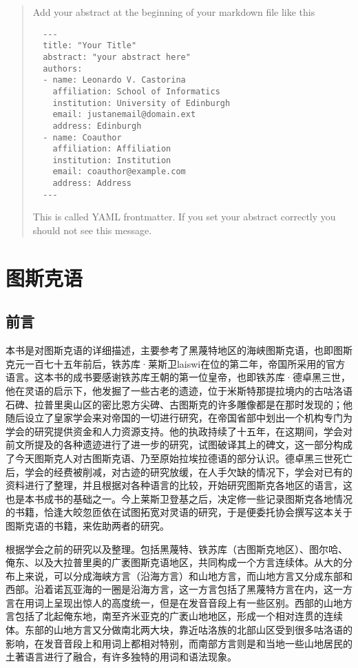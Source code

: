 \documentclass{article}
\title{}
\author{%
}
\begin{document}
\maketitle


\begin{abstract}
    Add your abstract at the beginning of your markdown file like this 
  \begin{verbatim}
  --- 
  title: "Your Title" 
  abstract: "your abstract here"
  authors:
  - name: Leonardo V. Castorina
    affiliation: School of Informatics
    institution: University of Edinburgh
    email: justanemail@domain.ext
    address: Edinburgh
  - name: Coauthor
    affiliation: Affiliation
    institution: Institution
    email: coauthor@example.com
    address: Address
  ---
  \end{verbatim}
  This is called YAML frontmatter. If you set your abstract correctly you should not see this message.
  \end{abstract}


\section{图斯克语}\label{ux56feux65afux514bux8bed}

\subsection{前言}\label{ux524dux8a00}

本书是对图斯克语的详细描述，主要参考了黑蔑特地区的海峡图斯克语，也即图斯克元一百七十五年前后，铁苏库·莱斯卫laiswi在位的第二年，帝国所采用的官方语言。这本书的成书要感谢铁苏库王朝的第一位皇帝，也即铁苏库·德卓黑三世，他在灵语的启示下，他发掘了一些古老的遗迹，位于米斯特那提拉境内的古咕洛语石碑、拉普里奥山区的密比恩方尖碑、古图斯克的许多雕像都是在那时发现的；他随后设立了皇家学会来对帝国的一切进行研究，在帝国省部中划出一个机构专门为学会的研究提供资金和人力资源支持。他的执政持续了十五年，在这期间，学会对前文所提及的各种遗迹进行了进一步的研究，试图破译其上的碑文，这一部分构成了今天图斯克人对古图斯克语、乃至原始拉埃拉德语的部分认识。德卓黑三世死亡后，学会的经费被削减，对古迹的研究放缓，在人手欠缺的情况下，学会对已有的资料进行了整理，并且根据对各种语言的比较，开始研究图斯克各地区的语言，这也是本书成书的基础之一。今上莱斯卫登基之后，决定修一些记录图斯克各地情况的书籍，恰逢大皎忽匝依在试图拓宽对灵语的研究，于是便委托协会撰写这本关于图斯克语的书籍，来佐助两者的研究。

根据学会之前的研究以及整理。包括黑蔑特、铁苏库（古图斯克地区）、图尔哈、俺东、以及大拉普里奥的广袤图斯克语地区，共同构成一个方言连续体。从大的分布上来说，可以分成海峡方言（沿海方言）和山地方言，而山地方言又分成东部和西部。沿着诺瓦亚海的一圈是沿海方言，这一方言包括了黑蔑特方言在内，这一方言在用词上呈现出惊人的高度统一，但是在发音音段上有一些区别。西部的山地方言包括了北起俺东地，南至齐米亚克的广袤山地地区，形成一个相对连贯的连续体。东部的山地方言又分做南北两大块，靠近咕洛族的北部山区受到很多咕洛语的影响，在发音音段上和用词上都相对特别，而南部方言则是和当地一些山地居民的土著语言进行了融合，有许多独特的用词和语法现象。
\end{document}

